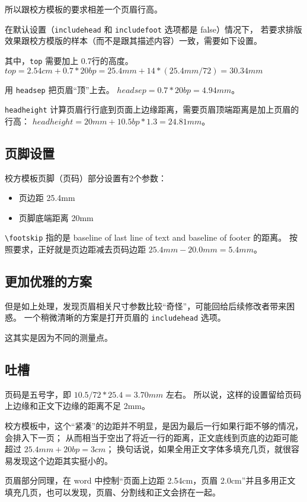 \documentclass[../Main/thesis.tex]{subfiles}
\begin{document}
所以跟校方模板的要求相差一个页眉行高。

在默认设置（\texttt{includehead} 和 \texttt{includefoot} 选项都是
false）情况下，
若要求排版效果跟校方模版的样本（而不是跟其描述内容）一致，需要如下设置。


其中，\texttt{top} 需要加上 0.7行的高度。
\(top = 2.54cm + 0.7*20bp = 25.4mm + 14*(25.4mm/72) = 30.34mm\)

用 \texttt{headsep} 把页眉``顶''上去。 \(headsep = 0.7*20bp = 4.94mm\)。

\texttt{headheight}
计算页眉行行底到页面上边缘距离，需要页眉顶端距离是加上页眉的行高：
\(headheight = 20mm + 10.5bp*1.3 = 24.81mm\)。

\subsection{页脚设置}
校方模板页脚（页码）部分设置有2个参数：
\begin{itemize}[\textbullet]
  \item 页边距 25.4mm
  \item 页脚底端距离 20mm
\end{itemize}

\texttt{\textbackslash{}footskip} 指的是 baseline of last line of text
and baseline of footer 的距离。 按照要求，正好就是页边距减去页码边距
\(25.4mm - 20.0mm = 5.4mm\)。

\subsection{更加优雅的方案}

但是如上处理，发现页眉相关尺寸参数比较``奇怪''，可能回给后续修改者带来困惑。
一个稍微清晰的方案是打开页眉的 \texttt{includehead} 选项。

这其实是因为不同的测量点。

\subsection{吐槽}

页码是五号字，即 \(10.5/72*25.4 = 3.70mm\) 左右。
所以说，这样的设置留给页码上边缘和正文下边缘的距离不足 2mm。

校方模板中，这个``紧凑''的边距并不明显，是因为最后一行如果行距不够的情况，会排入下一页；
从而相当于空出了将近一行的距离，正文底线到页底的边距可能超过
\(25.4mm + 20bp = 3cm\)；
换句话说，如果全用正文字体多填充几页，就很容易发现这个边距其实挺小的。

页眉部分同理，在 word 中控制``页面上边距 2.54cm，页眉
2.0cm''并且多用正文填充几页，也可以发现，页眉、分割线和正文会挤在一起。
\end{document}
